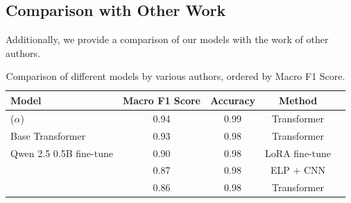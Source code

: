 \subsection{Comparison with Other Work}

Additionally, we provide a comparison of our models with the work of other authors.

\begin{table}[ht]
    \centering
    \small
    \renewcommand{\arraystretch}{1.1}
    \begin{tabularx}{\textwidth}{Xcccc}
        \toprule
        \textbf{Model} & \textbf{Macro F1 Score} & \textbf{Accuracy} & \textbf{Method} \tabularnewline \midrule
        \cite{Hu2022} ($\alpha$) & 0.94 & 0.99 & Transformer \tabularnewline
        Base Transformer & 0.93 & 0.98 & Transformer \tabularnewline
        Qwen 2.5 0.5B fine-tune & 0.90 & 0.98 & LoRA fine-tune \tabularnewline
        \cite{Mousavi2021} & 0.87 & 0.98 & ELP + CNN \tabularnewline
        \cite{ECGformer} & 0.86 & 0.98 & Transformer \tabularnewline
        \bottomrule
    \end{tabularx}
    \caption[Comparison of Results]{Comparison of different models by various authors, ordered by Macro F1 Score.}
    \label{tab:04_comparison_of_results}
\end{table}









